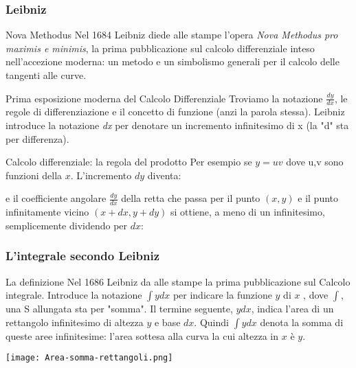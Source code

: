 \begin{frame}[label=Leibniz]
    \frametitle{Leibniz}
    \begin{block}{Nova Methodus}
    Nel 1684 Leibniz diede alle stampe l'opera \textit{Nova Methodus pro maximis e minimis}, 
    la prima pubblicazione sul \alert{calcolo differenziale}  
    inteso nell'accezione moderna: un metodo e un simbolismo generali
    per il calcolo delle tangenti alle curve.
    \end{block}
    \pause
    \begin{block}{Prima esposizione moderna del Calcolo Differenziale}
        Troviamo la notazione $\frac{dy}{dx}$, le regole di differenziazione e il concetto 
        di funzione (anzi la parola stessa). Leibniz introduce la notazione \textit{dx} 
        per denotare un incremento infinitesimo di x (la "d" sta per differenza).
    \end{block}
    \pause
    \begin{exampleblock}{Calcolo differenziale: la regola del prodotto}
        Per esempio se $y = uv$ dove u,v sono funzioni della $x$.
        L'incremento $dy$ diventa:
        \begin{center}
            \scalebox{1.5}{%
            $dy=(u+du)(v+dv)-uv = udv+vdu+ dudv$%
            }
        \end{center}
        e il coefficiente angolare $\frac{dy}{dx}$ della retta che passa 
        per il punto $(x,y)$ e il punto infinitamente vicino $(x+dx,y+dy)$
        si ottiene, a meno di un infinitesimo, semplicemente dividendo per $dx$:
        \begin{center}
        \end{center}
    \end{exampleblock}
\end{frame}

\begin{frame}
    \frametitle{L'integrale secondo Leibniz}
    \begin{block}{La definizione}
        Nel 1686 Leibniz da alle stampe la prima pubblicazione 
        sul Calcolo integrale. Introduce la notazione $\int$$ydx$ per indicare
        la funzione $y$ di $x$ , dove $\int$, una S allungata sta per "somma".
        Il termine seguente, $ydx$, indica l'area di un rettangolo infinitesimo 
        di altezza $y$ e base $dx$. 
        Quindi $\int$$ydx$ denota la somma di queste aree infinitesime: 
        l'area sottesa alla curva la cui altezza in $x$ è $y$.  
    \end{block}
    \begin{center}
        \texttt{[image: Area-somma-rettangoli.png]}
    \end{center}
\end{frame}

